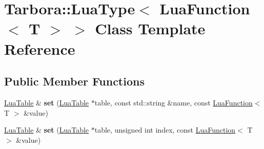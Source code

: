\hypertarget{classTarbora_1_1LuaType_3_01LuaFunction_3_01T_01_4_01_4}{}\section{Tarbora\+:\+:Lua\+Type$<$ Lua\+Function$<$ T $>$ $>$ Class Template Reference}
\label{classTarbora_1_1LuaType_3_01LuaFunction_3_01T_01_4_01_4}
\subsection*{Public Member Functions}
\begin{DoxyCompactItemize}
\item 
\mbox{\label{classTarbora_1_1LuaType_3_01LuaFunction_3_01T_01_4_01_4_a5fc66ae00896b6093ae4440fdbe0467e}} 
\hyperlink{classTarbora_1_1LuaTable}{Lua\+Table} \& {\bfseries set} (\hyperlink{classTarbora_1_1LuaTable}{Lua\+Table} $\ast$table, const std\+::string \&name, const \hyperlink{classTarbora_1_1LuaFunction}{Lua\+Function}$<$ T $>$ \&value)
\item 
\mbox{\label{classTarbora_1_1LuaType_3_01LuaFunction_3_01T_01_4_01_4_aab0763a170629596dc655f30b62a3d42}} 
\hyperlink{classTarbora_1_1LuaTable}{Lua\+Table} \& {\bfseries set} (\hyperlink{classTarbora_1_1LuaTable}{Lua\+Table} $\ast$table, unsigned int index, const \hyperlink{classTarbora_1_1LuaFunction}{Lua\+Function}$<$ T $>$ \&value)
\end{DoxyCompactItemize}
